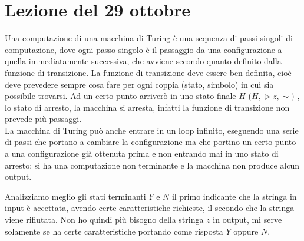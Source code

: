 \section{Lezione del 29 ottobre}
Una computazione di una macchina di Turing è una sequenza di passi singoli di computazione, dove ogni passo singolo è il passaggio da una configurazione a quella immediatamente successiva, che avviene secondo quanto definito dalla funzione di transizione. La funzione di transizione deve essere ben definita, cioè deve prevedere sempre cosa fare per ogni coppia (stato, simbolo) in cui sia possibile trovarsi. Ad un certo punto arriverò in uno stato finale $H$ ($H, \vartriangleright z, \sim)$ , lo stato di arresto, la macchina si arresta, infatti la funzione di transizione non prevede più passaggi.\\

La macchina di Turing può anche entrare in un loop infinito, eseguendo una serie di passi che portano a cambiare la configurazione ma che portino un certo punto a una configurazione già ottenuta prima e non entrando mai in uno stato di arresto: si ha una computazione non terminante e la macchina non produce alcun output.

Analizziamo meglio gli stati terminanti $Y$ e $N$ il primo indicante che la stringa in input è accettata, avendo certe caratteristiche richieste, il secondo che la stringa viene rifiutata. Non ho quindi più bisogno della stringa $z$ in output, mi serve solamente se ha certe caratteristiche portando come risposta $Y$ oppure $N$.

